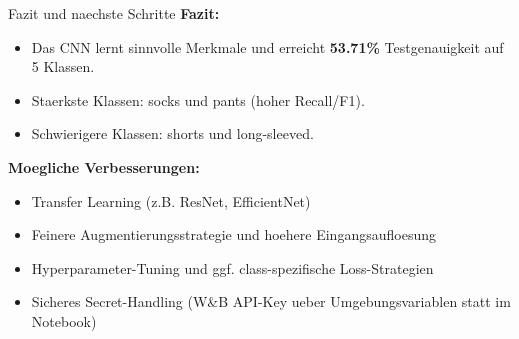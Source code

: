 \documentclass{beamer}
\begin{document}
\begin{frame}{Fazit und naechste Schritte}
\textbf{Fazit:}
\begin{itemize}
    \item Das CNN lernt sinnvolle Merkmale und erreicht \textbf{53.71\%} Testgenauigkeit auf 5 Klassen.
    \item Staerkste Klassen: socks und pants (hoher Recall/F1).
    \item Schwierigere Klassen: shorts und long-sleeved.
\end{itemize}

\textbf{Moegliche Verbesserungen:}
\begin{itemize}
    \item Transfer Learning (z.B. ResNet, EfficientNet)
    \item Feinere Augmentierungsstrategie und hoehere Eingangsaufloesung
    \item Hyperparameter-Tuning und ggf. class-spezifische Loss-Strategien
    \item Sicheres Secret-Handling (W\&B API-Key ueber Umgebungsvariablen statt im Notebook)
\end{itemize}
\end{frame}
\end{document}
